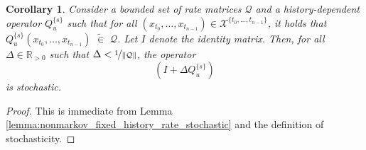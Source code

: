 \documentclass[10pt]{paper}
\newtheorem{corollary}[theorem]{Corollary}
\newcommand{\reals}{\mathbb{R}}
\newcommand{\realspos}{\reals_{>0}}
\newcommand{\states}{\mathcal{X}}
\newcommand{\norm}[1]{\left\lVert #1 \right\rVert}
\newcommand{\opinset}{\,\,\widetilde{\in}\,\,}
\begin{document}
\begin{corollary}\label{lemma:nonmarkov_rate_stochastic}
Consider a bounded set of rate matrices $\mathcal{Q}$ and a history-dependent operator $Q_u^{\{s\}}$ such that for all $(x_{t_0},\ldots,x_{t_{n-1}})\in\states^{\{t_0,\ldots,t_{n-1}\}}$, it holds that $Q_u^{\{s\}}(x_{t_0},\ldots,x_{t_{n-1}})\opinset\mathcal{Q}$. Let $I$ denote the identity matrix. Then, for all $\Delta\in\realspos$ such that $\Delta<\nicefrac{1}{\norm{\mathcal{Q}}}$, the operator
\begin{equation*}
\left(I + \Delta Q_u^{\{s\}}\right)
\end{equation*}
is stochastic.
\end{corollary}
\begin{proof}
This is immediate from Lemma \ref{lemma:nonmarkov_fixed_history_rate_stochastic} and the definition of stochasticity.
\end{proof}
\end{document}
